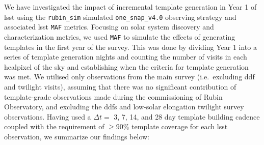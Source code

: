 \documentclass[preprintm,linenumbers]{aastex631}
\newcommand{\baseline}{\texttt{one\_snap\_v4.0}\xspace}
\newcommand{\rubinsim}{\texttt{rubin\_sim}\xspace}
\newcommand{\maf}{\texttt{MAF}\xspace}
\begin{document}
		We have investigated the impact of incremental template generation in Year 1 of \gls*{lsst} using the \rubinsim simulated \baseline observing strategy and associated \gls*{lsst} \maf metrics. %
  Focusing on solar system discovery and characterization metrics, we used \maf to simulate the effects of generating templates in the first year of the survey.
  This was done by dividing Year 1 into a series of template generation nights and counting the number of visits in each healpixel of the sky and establishing when the criteria for template generation was met.
  We utilised only observations from the main survey (i.e.\ excluding \gls*{ddf} and twilight visits), assuming that there was no significant contribution of template-grade observations made during the commissioning of Rubin Observatory, and excluding the \glspl*{ddf} and low-solar elongation twilight survey observations. 
  Having used a $\Delta t = $ 3, 7, 14, and 28 day template building cadence coupled with the requirement of $\geq90\%$ template coverage for each \gls*{lsst} observation, we summarize our findings below:
		
\end{document}
